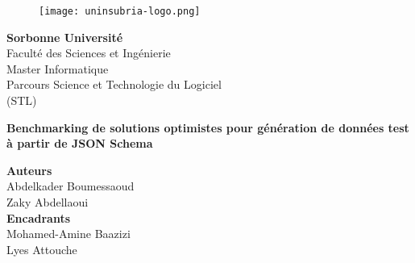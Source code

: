 \documentclass{article}
\begin{document}
\begin{titlepage}
\begin{figure}[!htb]
    \centering
    \texttt{[image: uninsubria-logo.png]}
\end{figure}

\begin{center}
    \Large{\textbf{Sorbonne Université}}
    \vspace{3mm}
    \\ \normalsize{Faculté des Sciences et Ingénierie}
    \vspace{6mm}
    \\ \normalsize{Master Informatique}
    \\ \normalsize{Parcours Science et Technologie du Logiciel}
    \\  \normalsize{(STL)}
    \vspace{13mm}
\end{center}

\vspace{8mm}
\begin{center}
    \LARGE{\textbf{Benchmarking de solutions optimistes pour génération de données test à partir de JSON Schema}}
\end{center}
\vspace{30mm}

\begin{minipage}[t]{0.47\textwidth}
	{\normalsize{\textbf{Auteurs}}{\normalsize\vspace{1mm}
    \\ \normalsize{Abdelkader Boumessaoud\\ Zaky Abdellaoui}}} \\
    
    {\normalsize{\textbf{Encadrants}}{\normalsize\vspace{1mm}
    \\ \normalsize{Mohamed-Amine Baazizi\\ Lyes Attouche}}}
\end{minipage}
\end{titlepage}
\newcommand{\json}[0]{JSON Schema}
\newcommand{\jsonsch}[0]{JSON Schema}
\newcommand{\jschon}[0]{\texttt{jschon}}
\newcommand{\jg}[0]{\texttt{json-data-generator}}
\newcommand{\jsf}[0]{\texttt{json-schema-faker}}
\newcommand{\je}[0]{\texttt{json-everything}}
\newpage
\tableofcontents
\newpage
\newcommand{\todo}[1]{\textcolor{blue}{\emph{[#1]}}}



\newpage
\end{document}

